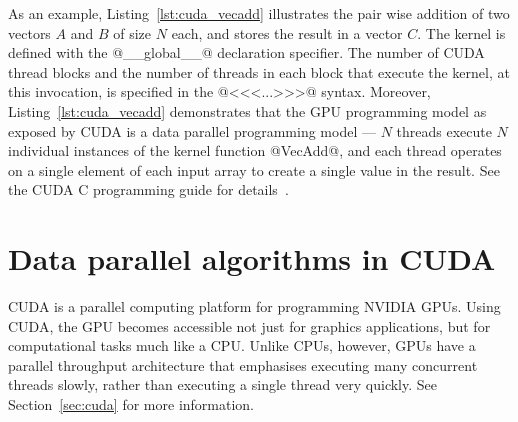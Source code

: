 As an example, Listing~\ref{lst:cuda_vecadd} illustrates the pair wise addition
of two vectors $A$ and $B$ of size $N$ each, and stores the result in a vector
$C$. The kernel is defined with the @__global__@
declaration specifier. The number of CUDA\cuda{} thread blocks and the number of
threads in each block that execute the kernel, at this invocation, is specified
in the @<<<...>>>@ syntax. Moreover, Listing~\ref{lst:cuda_vecadd} demonstrates
that the GPU\gpu{} programming model as exposed by CUDA is a data parallel
programming model --- $N$ threads execute $N$ individual instances of the kernel
function @VecAdd@, and each thread operates on a single element of each input
array to create a single value in the result. See the CUDA\cuda{} C programming
guide for details~\cite{NVIDIA:2012wf}.


\section{Data parallel algorithms in CUDA}
\label{sec:parallel_algorithms_in_cuda}

CUDA\cuda{} is a parallel computing platform for programming NVIDIA GPUs.
Using CUDA, the GPU\gpu{} becomes accessible not just for graphics applications,
but for computational tasks much like a CPU\@. Unlike CPUs, however, GPUs have a
parallel throughput architecture that emphasises executing many concurrent
threads slowly, rather than executing a single thread very quickly.
See Section~\ref{sec:cuda} for more information.

